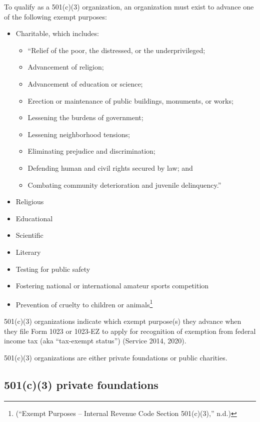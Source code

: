 \documentclass[
  letterpaper,
  DIV=11,
  numbers=noendperiod]{scrreprt}
\begin{document}
To qualify as a 501(c)(3) organization, an organization must exist to
advance one of the following exempt purposes:

\begin{itemize}
\item
  Charitable, which includes:

  \begin{itemize}
  \item
    ``Relief of the poor, the distressed, or the underprivileged;
  \item
    Advancement of religion;
  \item
    Advancement of education or science;
  \item
    Erection or maintenance of public buildings, monuments, or works;
  \item
    Lessening the burdens of government;
  \item
    Lessening neighborhood tensions;
  \item
    Eliminating prejudice and discrimination;
  \item
    Defending human and civil rights secured by law; and
  \item
    Combating community deterioration and juvenile delinquency.''
  \end{itemize}
\item
  Religious
\item
  Educational
\item
  Scientific
\item
  Literary
\item
  Testing for public safety
\item
  Fostering national or international amateur sports competition
\item
  Prevention of cruelty to children or animals\footnote{({``Exempt
    Purposes -- Internal Revenue Code Section 501(c)(3),''} n.d.)}
\end{itemize}

501(c)(3) organizations indicate which exempt purpose(s) they advance
when they file Form 1023 or 1023-EZ to apply for recognition of
exemption from federal income tax (aka ``tax-exempt status'') (Service
2014, 2020).

501(c)(3) organizations are either private foundations or public
charities.

\hypertarget{c3-private-foundations}{%
\subsection{501(c)(3) private
foundations}\label{c3-private-foundations}}
\end{document}
